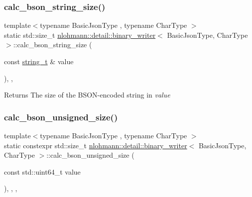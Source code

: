 \subsubsection{\texorpdfstring{calc\+\_\+bson\+\_\+string\+\_\+size()}{calc\_bson\_string\_size()}}
{\footnotesize\ttfamily template$<$typename Basic\+Json\+Type , typename Char\+Type $>$ \\
static std\+::size\+\_\+t \hyperlink{classnlohmann_1_1detail_1_1binary__writer}{nlohmann\+::detail\+::binary\+\_\+writer}$<$ Basic\+Json\+Type, Char\+Type $>$\+::calc\+\_\+bson\+\_\+string\+\_\+size (\begin{DoxyParamCaption}\item[{const \hyperlink{classnlohmann_1_1detail_1_1binary__writer_a29f2ae7a5c4a8c1dae47b3b2310de8a8}{string\+\_\+t} \&}]{value }\end{DoxyParamCaption})\hspace{0.3cm}{\ttfamily [inline]}, {\ttfamily [static]}, {\ttfamily [private]}}

\begin{DoxyReturn}{Returns}
The size of the B\+S\+O\+N-\/encoded string in {\itshape value} 
\end{DoxyReturn}
\mbox{\label{classnlohmann_1_1detail_1_1binary__writer_aa1d6bb9f3af16f07ce2440c354b5787b}} 
\subsubsection{\texorpdfstring{calc\+\_\+bson\+\_\+unsigned\+\_\+size()}{calc\_bson\_unsigned\_size()}}
{\footnotesize\ttfamily template$<$typename Basic\+Json\+Type , typename Char\+Type $>$ \\
static constexpr std\+::size\+\_\+t \hyperlink{classnlohmann_1_1detail_1_1binary__writer}{nlohmann\+::detail\+::binary\+\_\+writer}$<$ Basic\+Json\+Type, Char\+Type $>$\+::calc\+\_\+bson\+\_\+unsigned\+\_\+size (\begin{DoxyParamCaption}\item[{const std\+::uint64\+\_\+t}]{value }\end{DoxyParamCaption})\hspace{0.3cm}{\ttfamily [inline]}, {\ttfamily [static]}, {\ttfamily [private]}, {\ttfamily [noexcept]}}

